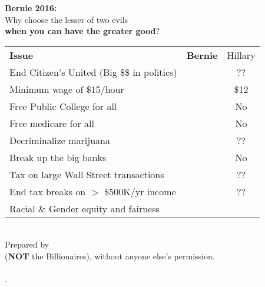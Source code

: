 \newcommand{\checkbox}{\makebox[0pt][l]{$\square$}\raisebox{.15ex}{\hspace{0.1em}$\checkmark$}}

\vspace{-12pt}

\begin{center}
  {\Huge\bf Bernie 2016:}\\

  {\small Why choose the lesser of two evils  \\
    {\bf when you can have the greater good}?}\\

  \begin{tabular}{l|c|c}
    {\bf Issue} & {\bf Bernie} & Hillary \\[2pt]
End Citizen's United (Big \$\$ in politics)  & \checkbox &	??	\\
Minimum wage of \$15/hour                    & \checkbox &	\$12	\\
Free Public College for all                  & \checkbox &	No	\\
Free medicare for all                        & \checkbox &	No	\\
Decriminalize marijuana                      & \checkbox &	??	\\
Break up the big banks                       & \checkbox &	No	\\
Tax on large Wall Street transactions        & \checkbox &	??	\\
End tax breaks on $>$ \$500K/yr income       & \checkbox &	??	\\
Racial \& Gender equity and fairness         & \checkbox & \checkbox    \\
\hline
  \end{tabular}
\\
Prepared by \GroupName\\
({\bf NOT} the Billionaires), without anyone else's permission.\\
{\tt \GroupURL}\\[-45pt]
.
\end{center}	
